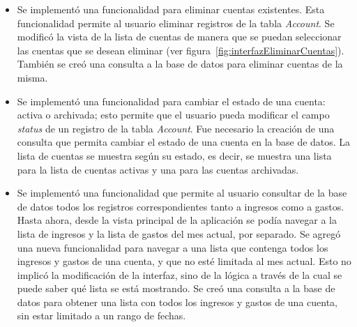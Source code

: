 \begin{itemize}
\item Se implementó una funcionalidad para eliminar cuentas existentes. Esta funcionalidad permite al usuario eliminar registros de la tabla \textit{Account}. Se modificó la vista de la lista de cuentas de manera que se puedan seleccionar las cuentas que se desean eliminar (ver figura~\ref{fig:interfazEliminarCuentas}). También se creó una consulta a la base de datos para eliminar cuentas de la misma.
\item Se implementó una funcionalidad para cambiar el estado de una cuenta: activa o archivada; esto permite que el usuario pueda modificar el campo \textit{status} de un registro de la tabla \textit{Account}. Fue necesario la creación de una consulta que permita cambiar el estado de una cuenta en la base de datos. La lista de cuentas se muestra según su estado, es decir, se muestra una lista para la lista de cuentas activas y una para las cuentas archivadas. 
\item Se implementó una funcionalidad que permite al usuario consultar de la base de datos todos los registros correspondientes tanto a ingresos como a gastos. Hasta ahora, desde la vista principal de la aplicación se podía navegar a la lista de ingresos y la lista de gastos del mes actual, por separado. Se agregó una nueva funcionalidad para navegar a una lista que contenga todos los ingresos y gastos de una cuenta, y que no esté limitada al mes actual. Esto no implicó la modificación de la interfaz, sino de la lógica a través de la cual se puede saber qué lista se está mostrando. Se creó una consulta a la base de datos para obtener una lista con todos los ingresos y gastos de una cuenta, sin estar limitado a un rango de fechas.
\end{itemize}
%
%
%
